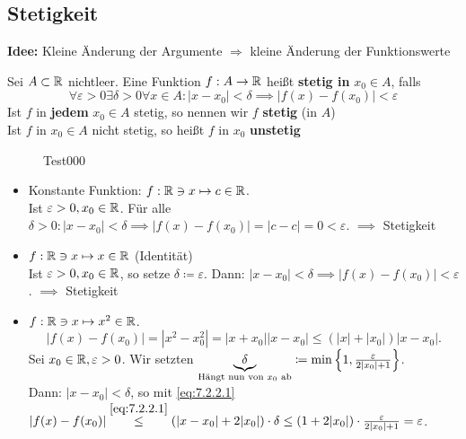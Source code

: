 \subsection{Stetigkeit}
\textbf{Idee:} Kleine Änderung der Argumente $ \Rightarrow $ kleine Änderung der Funktionswerte
\begin{subdefinition}
	Sei $ A\subset \mathbb{R}  $ nichtleer. Eine Funktion $ f: A \to  \mathbb{R}  $ heißt \textbf{stetig in} $ x_0 \in  A $, falls \[
		\forall \varepsilon > 0 \exists \delta > 0 \forall x \in A : \left| x  - x_0 \right| < \delta \implies \left| f(x) - f(x_0) \right| < \varepsilon 
	\]
	Ist $ f $ in \textbf{jedem} $ x_0 \in A $ stetig, so nennen wir $ f $ \textbf{stetig} (in $ A $)\\
	Ist $ f $ in $ x_0 \in A $ nicht stetig, so heißt $ f $ in $ x_0 $ \textbf{unstetig}
\end{subdefinition}

\begin{figure}[ht]
	\centering
	\caption{Test000}
\end{figure}

\begin{subexample}
	\begin{itemize}
		\item Konstante Funktion: $ f: \mathbb{R}  \ni x \mapsto c \in \mathbb{R}  $.\\
			Ist $ \varepsilon > 0, x_0 \in \mathbb{R}  $. Für alle $ \delta > 0 : \left| x - x_0 \right| < \delta \implies \left| f(x) - f(x_0) \right| = \left| c - c \right| = 0 < \varepsilon  $. $ \implies  $ Stetigkeit
		\item $ f: \mathbb{R}  \ni x \mapsto x \in \mathbb{R}  $ (Identität)\\
			Ist $ \varepsilon > 0, x_0 \in \mathbb{R} $, so setze $ \delta \coloneqq \varepsilon  $. Dann: $ \left| x - x_0 \right| < \delta \implies \left| f(x) - f(x_0) \right| < \varepsilon  $. $ \implies  $ Stetigkeit
		\item $ f: \mathbb{R}  \ni x \mapsto x^2 \in \mathbb{R}  $.\\
			\begin{equation}
				\left| f(x) - f(x_0) \right| = \left| x^2 - x_0^2 \right| = \left| x + x_0 \right| \left| x - x_0 \right| \leq ( | x | + | x_0 | ) | x - x_0 |.
				\label{eq:7.2.2.1}
			\end{equation}
			Sei $ x_0 \in \mathbb{R} , \varepsilon > 0 $. Wir setzten $ \underbrace{\delta}_{\text{Hängt nun von $ x_0 $ ab} } \coloneqq \min \left\{ 1, \frac{ \varepsilon  }{ 2|x_0| + 1 }  \right\}  $.\\
			Dann: $ | x - x_0 | < \delta $, so mit \eqref{eq:7.2.2.1}\\
			$ | f(x) - f(x_0) | \overset{\eqref{eq:7.2.2.1}}{\leq } \left( | x - x_0 | + 2|x_0| \right) \cdot \delta \leq ( 1 + 2|x_0|) \cdot  \frac{ \varepsilon  }{ 2|x_0| + 1 } = \varepsilon  $.
	\end{itemize}
\end{subexample}

